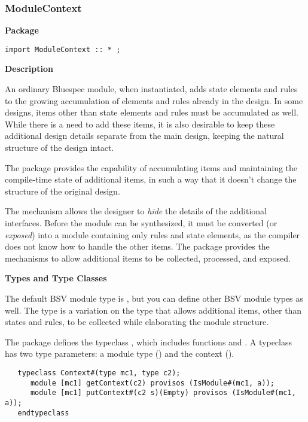 \subsubsection{ModuleContext}

\label{sec-ModuleContext}

{\bf Package}

\begin{verbatim}
import ModuleContext :: * ;
\end{verbatim}


{\bf Description}

An ordinary Bluespec module, when instantiated, adds  state
elements and rules to the growing accumulation of elements and rules
already in the design. 
In some designs,  items other than state 
elements and rules must be
accumulated as well. While there is a need to add these items, it is
also desirable to keep these additional design details separate from
the main design, keeping the natural structure of the design intact.

The  package provides the capability of 
accumulating items and maintaining the compile-time state of
additional items, in such a way that it doesn't change the structure
of the original design.

The  mechanism allows the designer to {\em hide} the
details of the additional interfaces.   Before the module can be
synthesized, it must be converted (or {\em exposed}) into a module containing
 only rules and state elements, as the
compiler does not know how to handle the other items.   The
 package provides the mechanisms to allow additional
items to be collected, processed, and exposed.



{\bf Types and Type Classes}

The default BSV module type is , but you can define other
BSV module types as well.  The  type is a variation
on the  type that allows additional items, other than
states and rules, to be collected while elaborating the module
structure.   


The  package defines the typeclass ,
which includes functions  and .   A
 typeclass has two type parameters: a module type
() and  the context (). 


\begin{verbatim}
   typeclass Context#(type mc1, type c2);
      module [mc1] getContext(c2) provisos (IsModule#(mc1, a));
      module [mc1] putContext#(c2 s)(Empty) provisos (IsModule#(mc1, a));
   endtypeclass
\end{verbatim}

